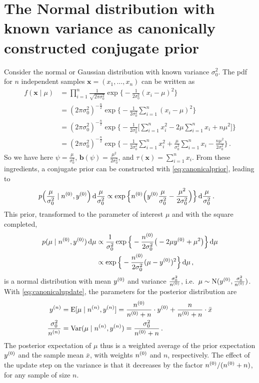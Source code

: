 \documentclass[12pt,a4paper	,twoside]{article}
\newcommand{\dd}{\,\mathrm{d}}
\newcommand{\mbf}[1]{\mathbf{#1}}
\newcommand{\bs}[1]{\boldsymbol{#1}}
\renewcommand{\vec}[1]{{\bs#1}}
\newcommand{\E}{\operatorname{E}}
\newcommand{\V}{\operatorname{Var}}
\newcommand{\norm}{\operatorname{N}}
\begin{document}
\appendix

\section{The Normal distribution with known variance as canonically constructed conjugate prior}
\label{sec:scalednormalconstruction}

Consider the normal or Gaussian distribution with known variance $\sigma^2_0$.
The pdf for $n$ independent samples $\vec{x} = (x_1,\ldots,x_n)$
can be written as
\begin{align}
\label{eq:normaldens}
f(\vec{x}\mid\mu)
 &= \prod_{i=1}^n \frac{1}{\sqrt{2\pi\sigma_0^2}} \exp\Big\{ -\frac{1}{2\sigma_0^2} (x_{i} - \mu)^2 \Big\} \nonumber\\
 &= (2\pi\sigma_0^2)^{-\frac{n}{2}}\exp\Big\{ -\frac{1}{2\sigma_0^2} \sum_{i=1}^n (x_{i} - \mu)^2 \Big\} \\
 &= (2\pi\sigma_0^2)^{-\frac{n}{2}}
    \exp\Big\{ -\frac{1}{2\sigma_0^2} \Big[ \sum_{i=1}^n x_{i}^2 -2\mu\sum_{i=1}^n x_{i} + n\mu^2 \Big] \Big\} \nonumber\\
 &= (2\pi\sigma_0^2)^{-\frac{n}{2}}
    \exp\Big\{ -\frac{1}{2\sigma_0^2} \sum_{i=1}^n x_{i}^2 +\frac{\mu}{\sigma_0^2} \sum_{i=1}^n x_{i} - \frac{n \mu^2}{2\sigma_0^2} \Big\}\,.
\end{align}
So we have here $\psi = \frac{\mu}{\sigma_0^2}$, $\mbf{b}(\psi) = \frac{\mu^2}{2\sigma_0^2}$, and $\tau(\vec{x}) = \sum_{i=1}^n x_i$.
From these ingredients, a conjugate prior can be constructed with \eqref{eq:canonicalprior}, leading to
\begin{align}
p\Big(\frac{\mu}{\sigma_0^2} \mid \nz, \yz\Big) \dd\frac{\mu}{\sigma_0^2}
 &\propto \exp\Big\{ \nz \Big(\yz \frac{\mu}{\sigma_0^2} - \frac{\mu^2}{2\sigma_0^2} \Big) \Big\} \dd\frac{\mu}{\sigma_0^2}\,.
\end{align}
This prior, transformed to the parameter of interest $\mu$ and with the square completed,
\begin{align}
p(\mu \mid \nz, \yz) \dd\mu
 &\propto \frac{1}{\sigma_0^2} \exp\Big\{ -\frac{\nz}{2\sigma_0^2} \big(-2\mu\yz + \mu^2\big)\Big\} \dd\mu \nonumber\\
 &\propto \exp\Big\{ -\frac{\nz}{2\sigma_0^2} (\mu - \yz)^2 \Big\} \dd\mu\,,
\end{align}
is a normal distribution with mean $y^{(0)}$ and variance $\frac{\sigma_0^2}{n^{(0)}}$,
i.e.\ $\mu \sim \norm(\yz, \frac{\sigma_0^2}{\nz})$.
With \eqref{eq:canonicalupdate}, the parameters for the posterior distribution are
\begin{align}
\yn &= \E[\mu\mid\nn, \yn] = \frac{\nz}{\nz + n} \cdot \yz + \frac{n}{\nz + n} \cdot \bar{x} \label{eq:normalposte}\\
\frac{\sigma_0^2}{\nn} &= \V(\mu\mid\nn, \yn) = \frac{\sigma_0^2}{\nz + n}\,. \label{eq:normalpostvar}
\end{align}
The posterior expectation of $\mu$ thus is a weighted average of the prior expectation $y^{(0)}$ and the sample mean $\bar{x}$,
with weights $n^{(0)}$ and $n$, respectively.
The effect of the update step on the variance is that it decreases by the factor $n^{(0)}/(n^{(0)}+n)$,
for any sample of size $n$.
\end{document}
